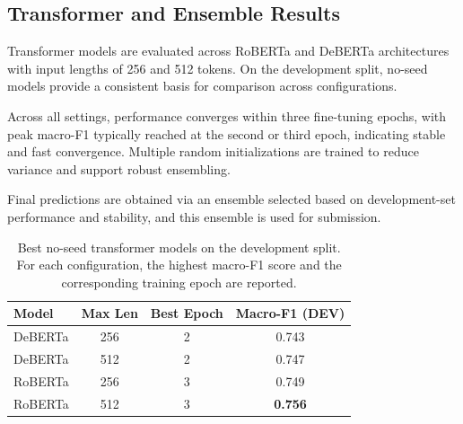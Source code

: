 \subsection{Transformer and Ensemble Results}

Transformer models are evaluated across RoBERTa and DeBERTa architectures
with input lengths of 256 and 512 tokens. On the development split, no-seed
models provide a consistent basis for comparison across configurations.

Across all settings, performance converges within three fine-tuning epochs,
with peak macro-F1 typically reached at the second or third epoch, indicating
stable and fast convergence. Multiple random initializations are trained to
reduce variance and support robust ensembling.

Final predictions are obtained via an ensemble selected based on
development-set performance and stability, and this ensemble is used for
submission.

\begin{table}[H]
\centering
\caption{Best no-seed transformer models on the development split. For each
configuration, the highest macro-F1 score and the corresponding training
epoch are reported.}
\label{tab:transformer_best_dev}
\begin{tabular}{lccc}
\hline
\textbf{Model} & \textbf{Max Len} & \textbf{Best Epoch} & \textbf{Macro-F1 (DEV)} \\
\hline
DeBERTa & 256 & 2 & 0.743 \\
DeBERTa & 512 & 2 & 0.747 \\
RoBERTa & 256 & 3 & 0.749 \\
RoBERTa & 512 & 3 & \textbf{0.756} \\
\hline
\end{tabular}
\end{table}
